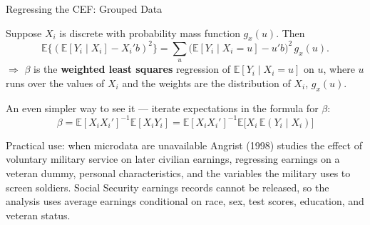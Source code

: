 \documentclass[aspectratio=169,11pt]{beamer}
\newcommand{\E}{\mathbb{E}}
\begin{document}
\begin{frame}{Regressing the CEF: Grouped Data}
\small

Suppose $X_i$ is discrete with probability mass function $g_x(u)$. Then
\[
\E\big\{(\E[Y_i\mid X_i]-X_i'b)^2\big\}
= \sum_u \big(\E[Y_i\mid X_i=u]-u'b\big)^2\, g_x(u).
\]
$\Rightarrow$ $\beta$ is the \textbf{weighted least squares} regression of
$\E[Y_i\mid X_i=u]$ on $u$, where $u$ runs over the values of $X_i$ and the
weights are the distribution of $X_i$, $g_x(u)$.

\medskip

An even simpler way to see it --- iterate expectations in the formula for
$\beta$:
\[
\boxed{
\beta = \E[X_iX_i']^{-1}\E[X_iY_i]
      = \E[X_iX_i']^{-1}\E\big[X_i\,\E(Y_i\mid X_i)\big]
}
\tag{3.1.5}
\]

\begin{block}{Practical use: when microdata are unavailable}
Angrist (1998) studies the effect of voluntary military service on later
civilian earnings, regressing earnings on a veteran dummy, personal
characteristics, and the variables the military uses to screen soldiers.
Social Security earnings records cannot be released, so the analysis uses
\alert{average earnings} conditional on race, sex, test scores, education,
and veteran status.
\end{block}

\end{frame}
\end{document}
